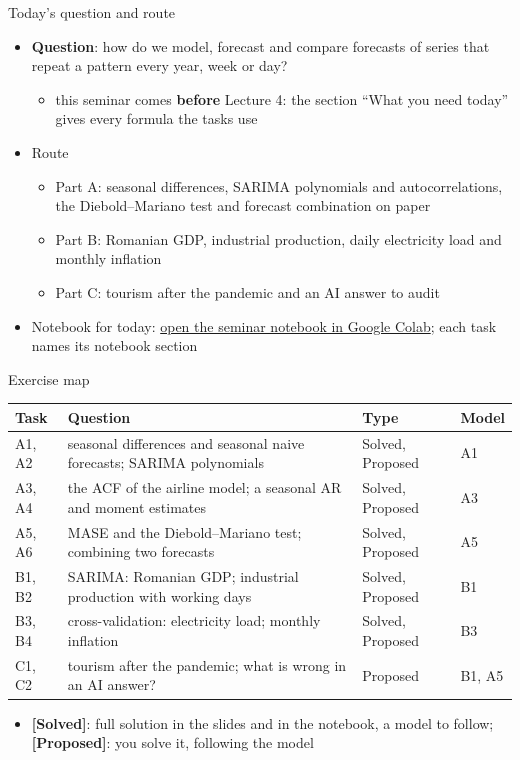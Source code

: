 \begin{frame}{Today's question and route}
\itemsize{\small}
\begin{itemize}
    \item \textbf{Question}: how do we model, forecast and compare forecasts of series that repeat a pattern every year, week or day?
    \begin{itemize}
        \item this seminar comes \textbf{before} Lecture 4: the section ``What you need today'' gives every formula the tasks use
    \end{itemize}
    \item Route
    \begin{itemize}
        \item Part A: seasonal differences, SARIMA polynomials and autocorrelations, the Diebold--Mariano test and forecast combination on paper
        \item Part B: Romanian GDP, industrial production, daily electricity load and monthly inflation
        \item Part C: tourism after the pandemic and an AI answer to audit
    \end{itemize}
    \item Notebook for today: \href{\nb}{open the seminar notebook in Google Colab}; each task names its notebook section
\end{itemize}
\end{frame}

\begin{frame}{Exercise map}
\itemsize{\small}
\begin{center}
\footnotesize
\begin{tabular}{>{\raggedright\arraybackslash}p{1.1cm}>{\raggedright\arraybackslash}p{7.5cm}>{\raggedright\arraybackslash}p{1.9cm}>{\raggedright\arraybackslash}p{1.4cm}}
\toprule
\textbf{Task} & \textbf{Question} & \textbf{Type} & \textbf{Model} \\
\midrule
A1, A2 & seasonal differences and seasonal naive forecasts; SARIMA polynomials & Solved, Proposed & A1 \\
A3, A4 & the ACF of the airline model; a seasonal AR and moment estimates & Solved, Proposed & A3 \\
A5, A6 & MASE and the Diebold--Mariano test; combining two forecasts & Solved, Proposed & A5 \\
B1, B2 & SARIMA: Romanian GDP; industrial production with working days & Solved, Proposed & B1 \\
B3, B4 & cross-validation: electricity load; monthly inflation & Solved, Proposed & B3 \\
C1, C2 & tourism after the pandemic; what is wrong in an AI answer? & Proposed & B1, A5 \\
\bottomrule
\end{tabular}
\end{center}
\begin{itemize}
    \item \textbf{[Solved]}: full solution in the slides and in the notebook, a model to follow; \textbf{[Proposed]}: you solve it, following the model
\end{itemize}
\end{frame}


